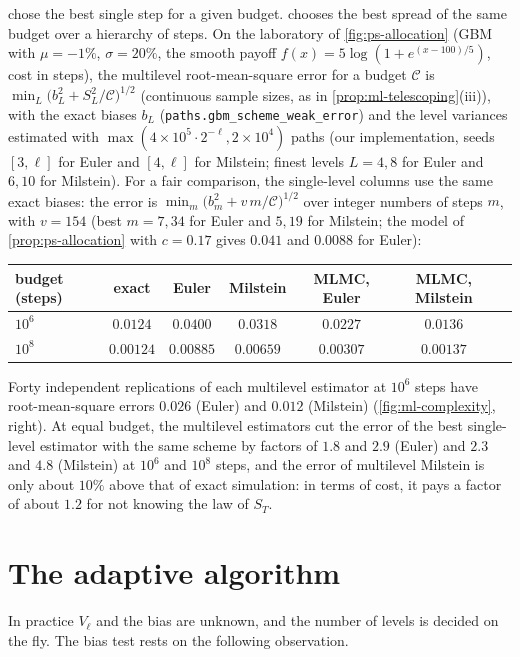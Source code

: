  chose the best single step for a given budget. 
chooses the best spread of the same budget over a hierarchy of steps. On the laboratory of
\cref{fig:ps-allocation} (GBM with $\mu=-1\%$, $\sigma=20\%$, the smooth payoff
$f(x)=5\log(1+e^{(x-100)/5})$, cost in steps), the multilevel root-mean-square error for a budget
$\mathcal C$ is $\min_L\big(b_L^2+S_L^2/\mathcal C\big)^{1/2}$ (continuous sample sizes, as in
\cref{prop:ml-telescoping}(iii)), with the exact biases $b_L$
(\texttt{paths.gbm\_scheme\_weak\_error}) and the level variances estimated with
$\max(4\times10^5\cdot2^{-\ell},2\times10^4)$ paths (our implementation, seeds $[3,\ell]$ for
Euler and $[4,\ell]$ for Milstein; finest levels $L=4,8$ for Euler and $6,10$ for Milstein). For a
fair comparison, the single-level columns use the same exact biases: the error is
$\min_m\big(b_m^2+v\,m/\mathcal C\big)^{1/2}$ over integer numbers of steps $m$, with $v=154$ (best
$m=7,34$ for Euler and $5,19$ for Milstein; the model of \cref{prop:ps-allocation} with $c=0.17$
gives $0.041$ and $0.0088$ for Euler):
\begin{center}
\begin{tabular}{lcccccc}
\toprule
budget (steps) & exact & Euler & Milstein & MLMC, Euler & MLMC, Milstein\\
\midrule
$10^6$ & $0.0124$ & $0.0400$ & $0.0318$ & $0.0227$ & $0.0136$\\
$10^8$ & $0.00124$ & $0.00885$ & $0.00659$ & $0.00307$ & $0.00137$\\
\bottomrule
\end{tabular}
\end{center}
Forty independent replications of each multilevel estimator at $10^6$ steps have root-mean-square
errors $0.026$ (Euler) and $0.012$ (Milstein) (\cref{fig:ml-complexity}, right). At equal budget,
the multilevel estimators cut the error of the best single-level estimator with the same scheme by
factors of $1.8$ and $2.9$ (Euler) and $2.3$ and $4.8$ (Milstein) at $10^6$ and $10^8$ steps, and
the error of multilevel Milstein is only about $10\%$ above that of exact simulation: in terms of
cost, it pays a factor of about $1.2$ for not knowing the law of $S_T$.

\section{The adaptive algorithm}\label{sec:ml-algorithm}

In practice $V_\ell$ and the bias are unknown, and the number of levels is decided on the fly.
The bias test rests on the following observation.

